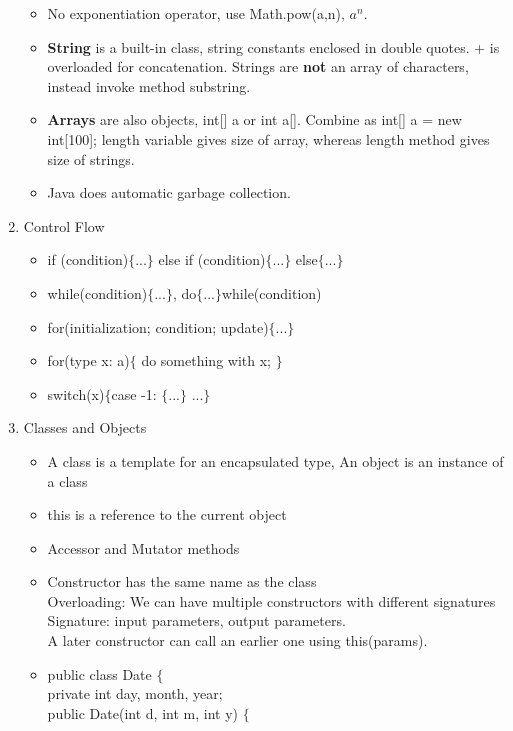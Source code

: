 \documentclass[a4paper]{article}
\begin{document}
\begin{enumerate}
\begin{itemize}
        \item No exponentiation operator, use Math.pow(a,n), $a^n$.
        \item \textbf{String} is a built-in class, string constants enclosed in double quotes. + is overloaded for concatenation. Strings are \textbf{not} an array of characters, instead invoke method substring.
        \item \textbf{Arrays} are also objects, int[] a or int a[]. Combine as int[] a = new int[100]; length variable gives size of array, whereas length method gives size of strings.
        \item Java does automatic garbage collection.
    \end{itemize}
    \item Control Flow
    \begin{itemize}
        \item if (condition)$\{$...$\}$ else if (condition)$\{$...$\}$ else$\{$...$\}$
        \item while(condition)$\{...\}$, do$\{...\}$while(condition)
        \item for(initialization; condition; update)$\{...\}$
        \item for(type x: a)$\{$ do something with x; $\}$
        \item switch(x)$\{$case -1: $\{...\}$ ...$\}$
    \end{itemize}
    \item Classes and Objects
    \begin{itemize}
        \item A class is a template for an encapsulated type, An object is an instance of a class
        \item this is a reference to the current object
        \item Accessor and Mutator methods
        \item Constructor has the same name as the class\\
        Overloading: We can have multiple constructors with different signatures\\
        Signature: input parameters, output parameters.\\
        A later constructor can call an earlier one using this(params).
        \item public class Date $\{$\\
        private int day, month, year;\\
        public Date(int d, int m, int y) $\{$\\

\end{itemize}
\end{enumerate}
\end{document}
